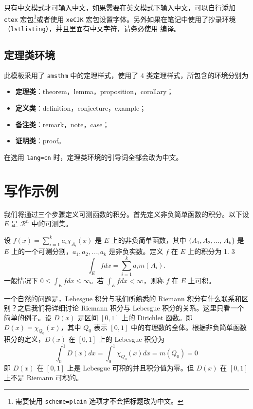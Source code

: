 \documentclass[cn,hazy,blue,14pt,screen]{elegantnote}
\begin{document}
\begin{note}
    只有中文模式才可输入中文，如果需要在英文模式下输入中文，可以自行添加 \lstinline{ctex} 宏包\footnote{需要使用 \lstinline{scheme=plain} 选项才不会把标题改为中文。}或者使用 \lstinline{xeCJK} 宏包设置字体。另外如果在笔记中使用了抄录环境（\lstinline{lstlisting}），并且里面有中文字符，请务必使用  编译。
\end{note}


\subsection{定理类环境}

此模板采用了 \lstinline{amsthm} 中的定理样式，使用了 4 类定理样式，所包含的环境分别为
\begin{itemize}
    \item \textbf{定理类}：theorem，lemma，proposition，corollary；
    \item \textbf{定义类}：definition，conjecture，example；
    \item \textbf{备注类}：remark，note，case；
    \item \textbf{证明类}：proof。
\end{itemize}

\begin{remark}
    在选用 \lstinline{lang=cn} 时，定理类环境的引导词全部会改为中文。
\end{remark}


\section{写作示例}

我们将通过三个步骤定义可测函数的积分。首先定义非负简单函数的积分。以下设 $E$ 是 $\mathcal{R}^n$ 中的可测集。

\begin{definition}[可积性]
    设 $ f(x)=\sum\limits_{i=1}^{k} a_i \chi_{A_i}(x)$ 是 $E$ 上的非负简单函数，其中 $\{A_1,A_2,\ldots$, $A_k\}$ 是 $E$ 上的一个可测分割，$a_1,a_2,\ldots,a_k$ 是非负实数。定义 $f$ 在 $E$ 上的积分为 1. 3
    \begin{equation}
        \label{inter}
        \int_{E} f dx = \sum_{i=1}^k a_i m(A_i).
    \end{equation}
    一般情况下 $0 \leq \int_{E} f dx \leq \infty$。若 $\int_{E} f dx < \infty$，则称 $f$ 在 $E$ 上可积。
\end{definition}

一个自然的问题是，Lebesgue 积分与我们所熟悉的 Riemann 积分有什么联系和区别？之后我们将详细讨论 Riemann 积分与 Lebesgue 积分的关系。这里只看一个简单的例子。设 $D(x)$ 是区间 $[0,1]$ 上的 Dirichlet 函数。即 $D(x)=\chi_{Q_0}(x)$，其中 $Q_0$ 表示 $[0,1]$ 中的有理数的全体。根据非负简单函数积分的定义，$D(x)$ 在 $[0,1]$ 上的 Lebesgue 积分为
\begin{equation}\label{inter2}
    \int_0^1 D(x)dx = \int_0^1 \chi_{Q_0} (x) dx = m(Q_0) = 0
\end{equation}
即 $D(x)$ 在 $[0,1]$ 上是 Lebesgue 可积的并且积分值为零。但 $D(x)$ 在 $[0,1]$ 上不是 Riemann 可积的。
\end{document}
